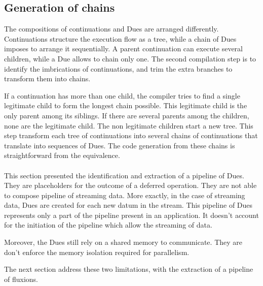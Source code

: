 
\subsection{Generation of chains}

The compositions of continuations and Dues are arranged differently.
Continuations structure the execution flow as a tree, while a chain of Dues imposes to arrange it sequentially.
A parent continuation can execute several children, while a Due allows to chain only one.
The second compilation step is to identify the imbrications of continuations, and trim the extra branches to transform them into chains.

If a continuation has more than one child, the compiler tries to find a single legitimate child to form the longest chain possible.
This legitimate child is the only parent among its siblings.
If there are several parents among the children, none are the legitimate child.
The non legitimate children start a new tree.
This step transform each tree of continuations into several chains of continuations that translate into sequences of Dues.
The code generation from these chains is straightforward from the equivalence.

\paragraph{}

This section presented the identification and extraction of a pipeline of Dues.
They are placeholders for the outcome of a deferred operation.
They are not able to compose pipeline of streaming data.
More exactly, in the case of streaming data, Dues are created for each new datum in the stream.
This pipeline of Dues represents only a part of the pipeline present in an application.
It doesn't account for the initiation of the pipeline which allow the streaming of data.

Moreover, the Dues still rely on a shared memory to communicate.
They are don't enforce the memory isolation required for parallelism.

The next section address these two limitations, with the extraction of a pipeline of fluxions.